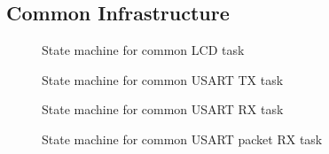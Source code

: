 \documentclass{article}
\begin{document}
\subsection{Common Infrastructure}
\label{app.sm.common}

\begin{figure}[H]
  \caption{State machine for common LCD task}
  
  \label{sm:9}
\end{figure}

\begin{figure}[H]
  \caption{State machine for common USART TX task}
  
  \label{sm:10}
\end{figure}

\begin{figure}[H]
  \caption{State machine for common USART RX task}
  
  \label{sm:11}
\end{figure}

\begin{figure}[H]
  \caption{State machine for common USART packet RX task}
  
  \label{sm:12}
\end{figure}
\end{document}
